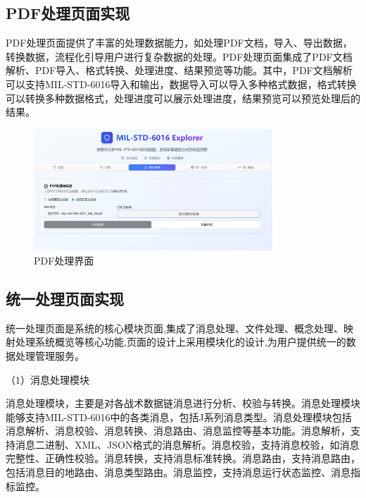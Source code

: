 \subsection{PDF处理页面实现}

PDF处理页面提供了丰富的处理数据能力，如处理PDF文档，导入、导出数据，转换数据，流程化引导用户进行复杂数据的处理。PDF处理页面集成了PDF文档解析、PDF导入、格式转换、处理进度、结果预览等功能。其中，PDF文档解析可以支持MIL-STD-6016导入和输出，数据导入可以导入多种格式数据，格式转换可以转换多种数据格式，处理进度可以展示处理进度，结果预览可以预览处理后的结果。

\begin{figure}[H]
\centering
\includegraphics[width=0.8\textwidth]{chapters/fig-0/front_pdfprocess.png}
\caption{PDF处理界面}
\label{fig:frontend-pdfprocess}
\end{figure}

\subsection{统一处理页面实现}

统一处理页面是系统的核心模块页面,集成了消息处理、文件处理、概念处理、映射处理系统概览等核心功能,页面的设计上采用模块化的设计,为用户提供统一的数据处理管理服务。

（1）消息处理模块

消息处理模块，主要是对各战术数据链消息进行分析、校验与转换。消息处理模块能够支持MIL-STD-6016中的各类消息，包括J系列消息类型。消息处理模块包括消息解析、消息校验、消息转换、消息路由、消息监控等基本功能。消息解析，支持消息二进制、XML、JSON格式的消息解析。消息校验，支持消息校验，如消息完整性、正确性校验。消息转换，支持消息标准转换。消息路由，支持消息路由，包括消息目的地路由、消息类型路由。消息监控，支持消息运行状态监控、消息指标监控。

